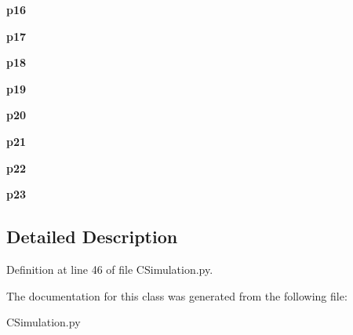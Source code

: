 \begin{DoxyCompactItemize}
{\bfseries p16}
\item 
\mbox{\label{class_c_simulation_1_1_simulation_1_1_building_1_1_occupant_1_1_profile_a063930b1d156024b2a1f54fd220f8c53}} 
{\bfseries p17}
\item 
\mbox{\label{class_c_simulation_1_1_simulation_1_1_building_1_1_occupant_1_1_profile_ab469cf128cb8d16118624a2c98101f31}} 
{\bfseries p18}
\item 
\mbox{\label{class_c_simulation_1_1_simulation_1_1_building_1_1_occupant_1_1_profile_a4f94840fcc5ecdc9627379934eedee3b}} 
{\bfseries p19}
\item 
\mbox{\label{class_c_simulation_1_1_simulation_1_1_building_1_1_occupant_1_1_profile_a203b1175b809633a81f0b8b373a65a9d}} 
{\bfseries p20}
\item 
\mbox{\label{class_c_simulation_1_1_simulation_1_1_building_1_1_occupant_1_1_profile_a7fcde72367d1274362d9c0ddfe62f721}} 
{\bfseries p21}
\item 
\mbox{\label{class_c_simulation_1_1_simulation_1_1_building_1_1_occupant_1_1_profile_a91c1dfa911ba0f5b7495d9f780955e6c}} 
{\bfseries p22}
\item 
\mbox{\label{class_c_simulation_1_1_simulation_1_1_building_1_1_occupant_1_1_profile_a09aac2df9e6628a1d4da2ea7e14671a4}} 
{\bfseries p23}
\end{DoxyCompactItemize}


\subsection{Detailed Description}


Definition at line 46 of file C\+Simulation.\+py.



The documentation for this class was generated from the following file\+:\begin{DoxyCompactItemize}
\item 
C\+Simulation.\+py\end{DoxyCompactItemize}
